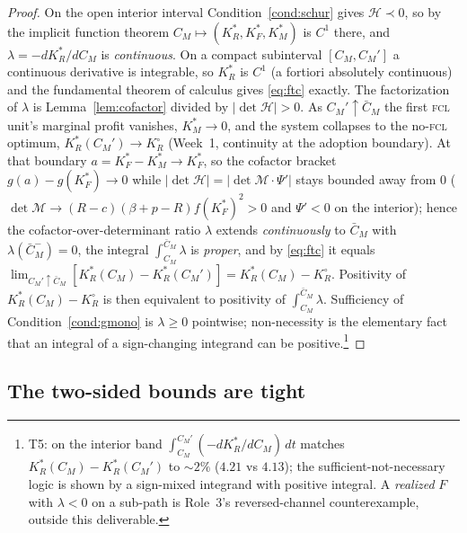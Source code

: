 \documentclass[11pt,reqno]{amsart}
\theoremstyle{plain}
\theoremstyle{definition}
\theoremstyle{remark}
\newcommand{\KRs}{K_R^{*}}
\newcommand{\KFs}{K_F^{*}}
\newcommand{\KMs}{K_M^{*}}
\newcommand{\KRo}{K_R^{\circ}}
\newcommand{\CM}{C_M}
\newcommand{\CMbar}{\bar C_M}
\newcommand{\bp}{\beta+p}
\newcommand{\Hcal}{\mathcal H}
\begin{document}
\begin{proof}
On the open interior interval Condition~\ref{cond:schur} gives $\Hcal\prec0$, so by
the implicit function theorem $\CM\mapsto(\KRs,\KFs,\KMs)$ is $C^{1}$ there, and
$\lambda=-d\KRs/d\CM$ is \emph{continuous}. On a compact subinterval $[\CM,\CM']$ a
continuous derivative is integrable, so $\KRs$ is $C^{1}$ (a fortiori absolutely
continuous) and the fundamental theorem of calculus gives \eqref{eq:ftc} exactly.
The factorization of $\lambda$ is Lemma~\ref{lem:cofactor} divided by
$|\det\Hcal|>0$. As $\CM'\uparrow\CMbar$ the first \textsc{fcl} unit's marginal
profit vanishes, $\KMs\to0$, and the system collapses to the no-\textsc{fcl}
optimum, $\KRs(\CM')\to\KRo$ (Week~1, continuity at the adoption boundary). At that
boundary $a=\KFs-\KMs\to\KFs$, so the cofactor bracket $g(a)-g(\KFs)\to0$ while
$|\det\Hcal|=|\det\mathcal M\cdot\Psi'|$ stays bounded away from $0$
($\det\mathcal M\to(R-c)(\bp-R)f(\KFs)^2>0$ and $\Psi'<0$ on the interior); hence
the cofactor-over-determinant ratio $\lambda$ extends \emph{continuously} to
$\CMbar$ with $\lambda(\CMbar^-)=0$, the
integral $\int_{\CM}^{\CMbar}\lambda$ is \emph{proper}, and by \eqref{eq:ftc} it
equals $\lim_{\CM'\uparrow\CMbar}[\KRs(\CM)-\KRs(\CM')]=\KRs(\CM)-\KRo$. Positivity of
$\KRs(\CM)-\KRo$ is then equivalent to positivity of $\int_{\CM}^{\CMbar}\lambda$.
Sufficiency of Condition~\ref{cond:gmono} is $\lambda\ge0$ pointwise; non-necessity
is the elementary fact that an integral of a sign-changing integrand can be
positive.\footnote{T5: on the interior band $\int_{\CM}^{\CM'}(-d\KRs/d\CM)\,dt$
matches $\KRs(\CM)-\KRs(\CM')$ to $\sim2\%$ ($4.21$ vs $4.13$); the
sufficient-not-necessary logic is shown by a sign-mixed integrand with positive
integral. A \emph{realized} $F$ with $\lambda<0$ on a sub-path is Role~3's
reversed-channel counterexample, outside this deliverable.}
\end{proof}

\subsection{The two-sided bounds are tight}
\end{document}
